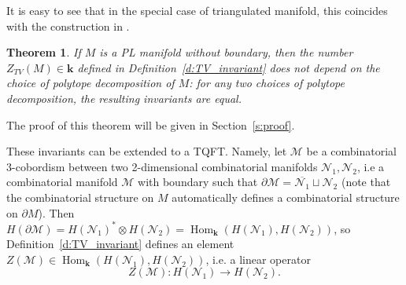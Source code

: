 \documentclass{amsart}
\newtheorem{theorem}{Theorem}[section]
\theoremstyle{definition}
\theoremstyle{remark}
\numberwithin{equation}{section}
\newcommand{\deref}[1]{Definition~{\rm\ref{#1}}}
\newcommand{\seref}[1]{Section~{\rm\ref{#1}}}
\newcommand{\ov}{\overline}
\newcommand{\del}{\partial}
\newcommand{\<}{\langle}
\renewcommand{\>}{\rangle}
\newcommand{\kk}{\mathbf{k}}       %
\newcommand{\N}{\mathcal{N}}       %
\newcommand{\M}{\mathcal{M}}      %
\DeclareMathOperator{\Hom}{Hom}
\begin{document}
It is easy to see that in the special case of triangulated manifold, this
coincides with the construction in .

\begin{theorem}\label{t:main1}
  If $M$ is a PL manifold without boundary, then the
  number $Z_{TV}(M)\in \kk$ defined in \deref{d:TV_invariant} does not
  depend on the choice of polytope decomposition of $M$: for any two
  choices of polytope decomposition, the resulting 
  invariants are equal.
\end{theorem}
The proof of this theorem will be given in \seref{s:proof}.

These invariants can be extended to a TQFT. Namely, let $\M$ be a
combinatorial 3-cobordism between two 2-dimensional combinatorial
manifolds $\N_1,\N_2$, i.e a combinatorial manifold $\M$ with boundary such
that $\del \M=\ov{\N_1}\sqcup \N_2$ (note that the combinatorial structure
on $M$ automatically defines a combinatorial structure on $\del M$). Then
$H(\del \M)=H(\N_1)^*\otimes H(\N_2)=\Hom_\kk(H(\N_1),H(\N_2))$, so
\deref{d:TV_invariant} defines an element $Z(\M)\in
\Hom_\kk(H(\N_1),H(\N_2))$, i.e. a linear operator 
$$
Z(\M)\colon H(\N_1)\to H(\N_2).
$$
\end{document}
